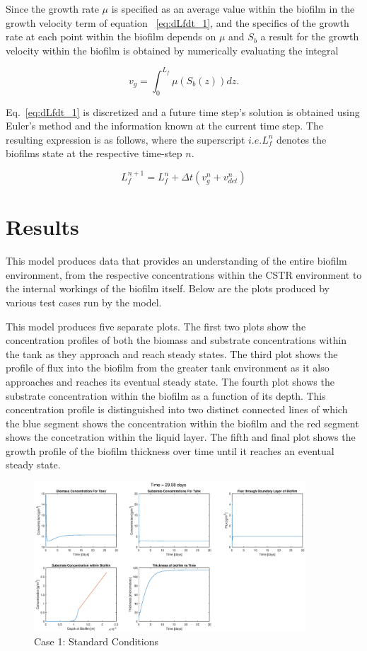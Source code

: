 \documentclass[letterpaper, twoside]{article}
\numberwithin{equation}{section}
\newcommand{\ie}{i.e.}
\begin{document}
Since the growth rate $\mu$ is specified as an average value within the biofilm in the growth velocity term of equation ~\ref{eq:dLfdt_1}, and the specifics of the growth rate at each point within the biofilm depends on $\mu$ and $S_b$ a result for the growth velocity within the biofilm is obtained by numerically evaluating the integral 

\begin{equation}
  \label{eq:vg_int}
  {v_g}={\int_{0}^{L_f}\mu(S_b(z)) dz}.
\end{equation}

Eq.~\ref{eq:dLfdt_1} is discretized and a future time step's solution is obtained using Euler's method and the information known at the current time step. The resulting expression is as follows, where the superscript $\ie L_f^{n}$ denotes the biofilms state at the respective time-step $n$.

\begin{equation}
  \label{eq:dLfdt_2}
  {L_f^{n+1}}={L_f^{n}} + {\Delta t}({v_g^{n}+v_{det}^{n}})
\end{equation}

\section{Results}
This model produces data that provides an understanding of the entire biofilm environment, from the respective concentrations within the CSTR environment to the internal workings of the biofilm itself. Below are the plots produced by various test cases run by the model.

This model produces five separate plots. The first two plots show the concentration profiles of both the biomass and substrate concentrations within the tank as they approach and reach steady states. The third plot shows the profile of flux into the biofilm from the greater tank environment as it also approaches and reaches its eventual steady state. The fourth plot shows the substrate concentration within the biofilm as a function of its depth. This concentration profile is distinguished into two distinct connected lines of which the blue segment shows the concentration within the biofilm and the red segment shows the concetration within the liquid layer. The fifth and final plot shows the growth profile of the biofilm thickness over time until it reaches an eventual steady state.

\begin{figure}[H]
  \centering
  \includegraphics[read=eps, width=4in]{Testcase1_figure.eps}
  \caption{Case 1: Standard Conditions}
\end{figure}
\end{document}
